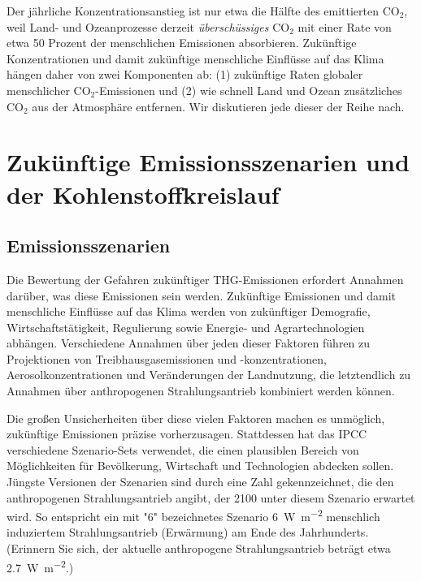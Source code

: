 \documentclass[12pt,paper=a4,DIV=12,parskip=never,chapterprefix=false,headings=standardclasses]{scrreprt}
\numberwithin{figure}{chapter}
\begin{document}
Der jährliche Konzentrationsanstieg ist nur etwa die Hälfte des emittierten CO$_2$, weil Land- und Ozeanprozesse derzeit \emph{überschüssiges} CO$_2$ mit einer Rate von etwa 50 Prozent der menschlichen Emissionen absorbieren. Zukünftige Konzentrationen und damit zukünftige menschliche Einflüsse auf das Klima hängen daher von zwei Komponenten ab: (1) zukünftige Raten globaler menschlicher CO$_2$-Emissionen und (2) wie schnell Land und Ozean zusätzliches CO$_2$ aus der Atmosphäre entfernen. Wir diskutieren jede dieser der Reihe nach.

\section{Zukünftige Emissionsszenarien und der Kohlenstoffkreislauf}

\subsection{Emissionsszenarien}

Die Bewertung der Gefahren zukünftiger THG-Emissionen erfordert Annahmen darüber, was diese Emissionen sein werden. Zukünftige Emissionen und damit menschliche Einflüsse auf das Klima werden von zukünftiger Demografie, Wirtschaftstätigkeit, Regulierung sowie Energie- und Agrartechnologien abhängen. Verschiedene Annahmen über jeden dieser Faktoren führen zu Projektionen von Treibhausgasemissionen und -konzentrationen, Aerosolkonzentrationen und Veränderungen der Landnutzung, die letztendlich zu Annahmen über anthropogenen Strahlungsantrieb kombiniert werden können.

Die großen Unsicherheiten über diese vielen Faktoren machen es unmöglich, zukünftige Emissionen präzise vorherzusagen. Stattdessen hat das IPCC verschiedene Szenario-Sets verwendet, die einen plausiblen Bereich von Möglichkeiten für Bevölkerung, Wirtschaft und Technologien abdecken sollen. Jüngste Versionen der Szenarien sind durch eine Zahl gekennzeichnet, die den anthropogenen Strahlungsantrieb angibt, der 2100 unter diesem Szenario erwartet wird. So entspricht ein mit "6" bezeichnetes Szenario \SI{6}{\watt\per\square\meter} menschlich induziertem Strahlungsantrieb (Erwärmung) am Ende des Jahrhunderts. (Erinnern Sie sich, der aktuelle anthropogene Strahlungsantrieb beträgt etwa \SI{2.7}{\watt\per\square\meter}.)
\end{document}
